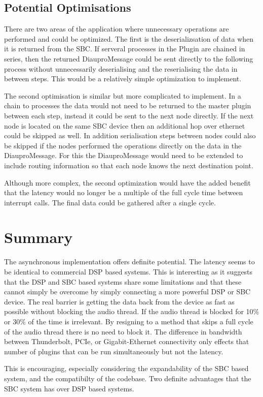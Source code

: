 \subsection{Potential Optimisations }

There are two areas of the application where unnecessary operations are performed and could be optimized. The first is the deserializsation of data when it is returned from the SBC. If serveral processes in the Plugin are chained in series, then the returned DiauproMessage could be sent directly to the following process without unnecessarily deserialising and the reserialising the data in between steps. This would be a relatively simple optimization to implement.

The second optimisation is similar but more complicated to implement. In a chain to processes the data would not need to be returned to the master plugin between each step, instead it could be sent to the next node directly. If the next node is located on the same SBC device then an additional hop over ethernet could be skipped as well. In addition serialisation steps between nodes could also be skipped if the nodes performed the operations directly on the data in the DiauproMessage. For this the DiauproMessage would need to be extended to include routing information so that each node knows the next destination point.

Although more complex, the second optimization would have the added benefit that the latency would no longer be a multiple of the full cycle time between interrupt calls. The final data could be gathered after a single cycle.

\section{Summary}

The asynchronous implementation offers definite potential. The latency seems to be identical to commercial DSP based systems\cite{UAD2-review}. This is interesting as it suggests that the DSP and SBC based systems share some limitations and that these cannot simply be overcome by simply connecting a more powerful DSP or SBC device. The real barrier is getting the data back from the device as fast as possible without blocking the audio thread. If the audio thread is blocked for 10\% or 30\% of the time is irrelevant. By resigning to a method that skips a full cycle of the audio thread there is no need to block it. The difference in bandwidth between Thunderbolt, PCIe, or Gigabit-Ethernet connectivity only effects that number of plugins that can be run simultaneously but not the latency.

This is encouraging, especially considering the expandability of the SBC based system, and the compatibilty of the codebase. Two definite advantages that the SBC system has over DSP based systems.






